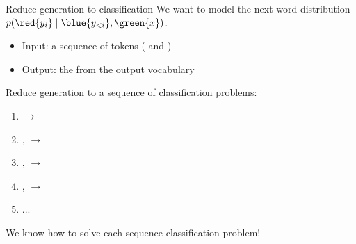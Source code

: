 \documentclass[usenames,dvipsnames,notes,11pt,aspectratio=169,hyperref={colorlinks=true, linkcolor=blue}]{beamer}
\begin{document}
\begin{frame}
    {Reduce generation to classification}
    We want to model the {next word distribution} $p(\red{y_i}\mid \blue{y_{<i}}, \green{x})$.\\
    \begin{itemize}
        \item Input: a sequence of tokens ( and )
        \item Output: the  from the output vocabulary
    \end{itemize}

    \pause
    Reduce generation to a sequence of classification problems:\\
    \begin{enumerate}[<+->]
        \item {}
            $\to$ 
        \item {},
            $\to$ 
        \item {},
            $\to$ 
        \item {},
            $\to$ 
        \item ...
    \end{enumerate}

    \pause
    We know how to solve each sequence classification problem! 

\end{frame}
\end{document}
